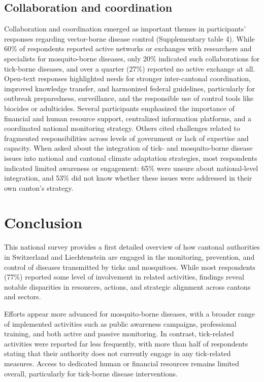 \documentclass[
  11pt,
]{article}
\begin{document}
\subsection{Collaboration and
coordination}\label{collaboration-and-coordination}

Collaboration and coordination emerged as important themes in
participants' responses regarding vector-borne disease control
(Supplementary table 4). While 60\% of respondents reported active
networks or exchanges with researchers and specialists for
mosquito-borne diseases, only 20\% indicated such collaborations for
tick-borne diseases, and over a quarter (27\%) reported no active
exchange at all. Open-text responses highlighted needs for stronger
inter-cantonal coordination, improved knowledge transfer, and harmonized
federal guidelines, particularly for outbreak preparedness,
surveillance, and the responsible use of control tools like biocides or
adulticides. Several participants emphasized the importance of financial
and human resource support, centralized information platforms, and a
coordinated national monitoring strategy. Others cited challenges
related to fragmented responsibilities across levels of government or
lack of expertise and capacity. When asked about the integration of
tick- and mosquito-borne disease issues into national and cantonal
climate adaptation strategies, most respondents indicated limited
awareness or engagement: 65\% were unsure about national-level
integration, and 53\% did not know whether these issues were addressed
in their own canton's strategy.

\section{Conclusion}\label{conclusion}

This national survey provides a first detailed overview of how cantonal
authorities in Switzerland and Liechtenstein are engaged in the
monitoring, prevention, and control of diseases transmitted by ticks and
mosquitoes. While most respondents (77\%) reported some level of
involvement in related activities, findings reveal notable disparities
in resources, actions, and strategic alignment across cantons and
sectors.

Efforts appear more advanced for mosquito-borne diseases, with a broader
range of implemented activities such as public awareness campaigns,
professional training, and both active and passive monitoring. In
contrast, tick-related activities were reported far less frequently,
with more than half of respondents stating that their authority does not
currently engage in any tick-related measures. Access to dedicated human
or financial resources remains limited overall, particularly for
tick-borne disease interventions.
\end{document}
